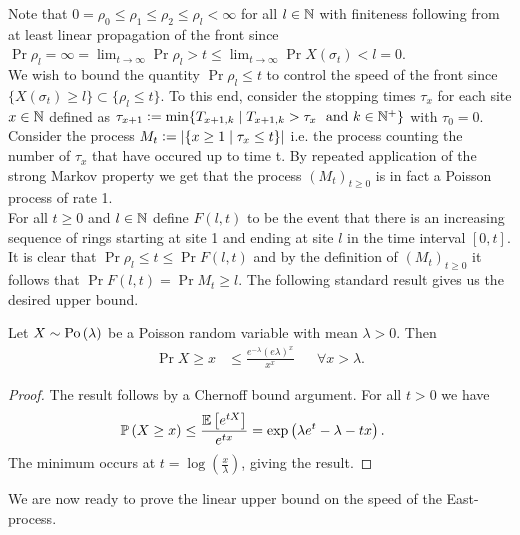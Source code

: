 Note that $0 = \rho_0 \leq \rho_1 \leq \rho_2 \leq \rho_l < \infty$ for all $l \in \mathbb{N}$ with finiteness following from at least linear propagation of the front since $\Pr{\rho_l = \infty} = \lim_{t \rightarrow \infty} \Pr{\rho_l > t} \leq \lim_{t \rightarrow \infty} \Pr{X\left( \sigma_t\right) < l} = 0$. \\

We wish to bound the quantity $\Pr{\rho_l \leq t}$ to control the speed of the front since  $\{X \left( \sigma_t \right) \geq l \} \subset \{\rho_l \leq t \}$. To this end, consider the stopping times $\tau_x$ for each site $x \in \mathbb{N}$ defined as $\tau_{x+1} \vcentcolon= \min\{ T_{x+1, k} \mid T_{x+1, k} > \tau_x\ \text{ and } k \in \mathbb{N}^+ \}$ with $\tau_0 = 0$. Consider the process $M_t \vcentcolon= |\{x \geq 1 \mid \tau_x \leq t \}|$ i.e. the process counting the number of $\tau_x$ that have occured up to time t. By repeated application of the strong Markov property we get that the process $(M_t)_{t \geq 0}$ is in fact a Poisson process of rate 1. \\

For all $t \geq 0$ and $l \in \mathbb{N}$ define $F(l, t)$ to be the event that there is an increasing sequence of rings starting at site 1 and ending at site $l$ in the time interval $[0, t]$. It is clear that $\Pr{\rho_l \leq t} \leq \Pr{F(l, t)}$ and by the definition of $(M_t)_{t \geq 0}$ it follows that $\Pr{F(l, t)} = \Pr{M_t \geq l}$. The following standard result gives us the desired upper bound. 

\begin{lemma}\label{lem:chernoff}
Let $X \sim \text{Po} \left( \lambda \right)$ be a Poisson random variable with mean $\lambda > 0$. Then 
\begin{align}
\Pr{X \geq x} &\leq \frac{e^{-\lambda}(e \lambda)^x}{x^x} &&\forall x > \lambda. 
\end{align} 
\end{lemma}

\begin{proof}
The result follows by a Chernoff bound argument. For all $t > 0$ we have
\begin{align*}
\mathbb{P} \left( X \geq x \right) &\leq \frac{\mathbb{E}\left[ e^{tX} \right]}{e^{tx}} = \exp\left( \lambda e^t - \lambda - tx \right). 
\end{align*} 
The minimum occurs at $t = \log\left( \frac{x}{\lambda} \right)$, giving the result. 
\end{proof}

We are now ready to prove the linear upper bound on the speed of the East-process.

